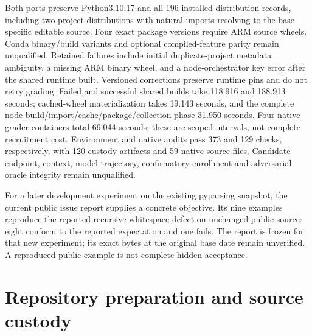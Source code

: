 Both ports preserve Python3.10.17 and all 196 installed distribution records,
including two project distributions with natural imports resolving to the
base-specific editable source. Four exact package versions require ARM source
wheels. Conda binary/build variants and optional compiled-feature parity remain
unqualified. Retained failures include initial duplicate-project metadata
ambiguity, a missing ARM binary wheel, and a node-orchestrator key error after
the shared runtime built. Versioned corrections preserve runtime pins and do
not retry grading. Failed and successful shared builds take 118.916 and 188.913
seconds; cached-wheel materialization takes 19.143 seconds, and the complete
node-build/import/cache/package/collection phase 31.950 seconds. Four native
grader containers total 69.044 seconds; these are scoped intervals, not complete
recruitment cost. Environment and native audits pass 373 and 129 checks,
respectively, with 120 custody artifacts and 59 native source files. Candidate
endpoint, context, model trajectory, confirmatory enrollment and adversarial
oracle integrity remain unqualified.

For a later development experiment on the existing pyparsing snapshot, the
current public issue report supplies a concrete objective. Its nine examples
reproduce the reported recursive-whitespace defect on unchanged public source:
eight conform to the reported expectation and one fails. The report is frozen
for that new experiment; its exact bytes at the original base date remain
unverified. A reproduced public example is not complete hidden acceptance.

\section{Repository preparation and source custody}
\label{sec:incremental-context-preparation}
